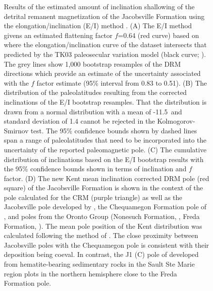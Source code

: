 \documentclass[draft]{agujournal2019}
\begin{document}
\begin{figure}[h!]
\caption{\scriptsize Results of the estimated amount of inclination shallowing of the detrital remanent magnetization of the Jacobsville Formation using the elongation/inclination (E/I) method \cite{Tauxe2004b}. (A) The E/I method givens an estimated flattening factor $f$=0.64 (red curve) based on where the elongation/inclination curve of the dataset intersects that predicted by the TK03 paleosecular variation model (black curve; ). The grey lines show 1,000 bootstrap resamples of the DRM directions which provide an estimate of the uncertainty associated with the $f$ factor estimate (95\% interval from 0.83 to 0.51). (B) The distribution of the paleolatitudes resulting from the corrected inclinations of the E/I bootstrap resamples. That the distribution is drawn from a normal distribution with a mean of -11.5\textdegree\ and standard deviation of 1.4 cannot be rejected in the Kolmogorov-Smirnov test. The 95\% confidence bounds shown by dashed lines span a range of paleolatitudes that need to be incorporated into the uncertainty of the reported paleomagnetic pole. (C) The cumulative distribution of inclinations based on the E/I bootstrap results with the 95\% confidence bounds shown in terms of inclination and $f$ factor. (D) The new Kent mean inclination corrected DRM pole (red square) of the Jacobsville Formation is shown in the context of the pole calculated for the CRM (purple triangle) as well as the Jacobsville pole developed by , the Chequamegon Formation pole of , and poles from the Oronto Group (Nonesuch Formation, , Freda Formation, ). The mean pole position of the Kent distribution was calculated following the method of . The close proximity between Jacobsville poles with the Chequamegon pole is consistent with their deposition being coeval. In contrast, the J1 (C) pole of  developed from hematite-bearing sedimentary rocks in the Sault Ste Marie region plots in the northern hemisphere close to the Freda Formation pole. }
\label{fig:EI_results}
\end{figure}
\end{document}
